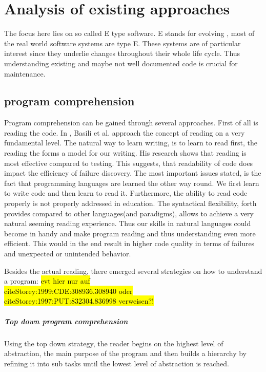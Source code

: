 \chapter{Analysis of existing approaches}

The focus here lies on so called E type software. E stands for evolving \cite{Cook:2006:ESS:1115566.1115567}, most of the real world software systems are type E. These systems are of particular interest since they underlie changes throughout their whole life cycle. Thus understanding existing and maybe not well documented code is crucial for maintenance.

\section{program comprehension}

Program comprehension can be gained through several approaches. First of all is reading the code.
In \cite{Basili:1997:EPR:257260.257262}, Basili et al. approach the concept of reading on a very fundamental level. The natural way to learn writing, is to learn to read first, the reading the forms a model for our writing.  His research shows that reading is most effective compared to testing. This suggests, that readability of code does impact the efficiency of failure discovery. The most important issues stated, is the fact that programming languages are learned the other way round. We first learn to write code and then learn to read it. Furthermore, the ability to read code properly is not properly addressed in education. The syntactical flexibility, forth provides compared to other languages(and paradigms), allows to achieve a very natural seeming reading experience. Thus our skills in natural languages could become in handy and make program reading and thus understanding even more efficient. This would in the end result in higher code quality in terms of failures and unexpected or unintended behavior.

Besides the actual reading, there emerged several strategies on how to understand a program\cite{Storey:1999:CDE:308936.308940}: \hl{evt hier nur auf \\cite{Storey:1999:CDE:308936.308940} oder \\cite{Storey:1997:PUT:832304.836998} verweisen?!}
\paragraph{Top down program comprehension} Using the top down strategy, the reader begins on the highest level of abstraction, the main purpose of the program and then builds a hierarchy by refining it into sub tasks until the lowest level of abstraction is reached.
